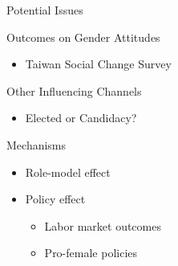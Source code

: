 \documentclass[
  9pt,
  ignorenonframetext,
  aspectratio=43,
]{beamer}
\providecommand{\tightlist}{%
  \setlength{\itemsep}{0pt}\setlength{\parskip}{0pt}}
\begin{document}
\begin{frame}{Potential Issues}
\begin{block}{Outcomes on Gender Attitudes}
\protect\hypertarget{outcomes-on-gender-attitudes}{}
\begin{itemize}
\tightlist
\item
  Taiwan Social Change Survey
\end{itemize}
\end{block}

\begin{block}{Other Influencing Channels}
\protect\hypertarget{other-influencing-channels}{}
\begin{itemize}
\tightlist
\item
  Elected or Candidacy?
\end{itemize}
\end{block}

\begin{block}{Mechanisms}
\protect\hypertarget{mechanisms}{}
\begin{itemize}
\tightlist
\item
  Role-model effect
\item
  Policy effect

  \begin{itemize}
  \tightlist
  \item
    Labor market outcomes
  \item
    Pro-female policies
  \end{itemize}
\end{itemize}
\end{block}
\end{frame}
\end{document}
